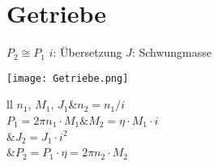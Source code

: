 \documentclass[german]{latex4ei/latex4ei_sheet}
\begin{document}
\section{Getriebe}
	\begin{sectionbox}

		\begin{bluebox}
		$P_2 \cong P_1$
		$i$: Übersetzung
		$J$: Schwungmasse
		\end{bluebox}
		\hspace{1.5cm} \texttt{[image: Getriebe.png]} 
			\begin{tablebox}{ll}
				$n_1$, $M_1$, $J_1$&$n_2= n_1/i$\\
				$P_1 = 2\pi n_1\cdot M_1$&$M_2=\eta\cdot M_1 \cdot i$\\
				&$J_2=J_1\cdot i^2$\\
				&$P_2=P_1\cdot \eta= 2\pi n_2\cdot M_2$\\
			\end{tablebox}
	\end{sectionbox}
\end{document}
